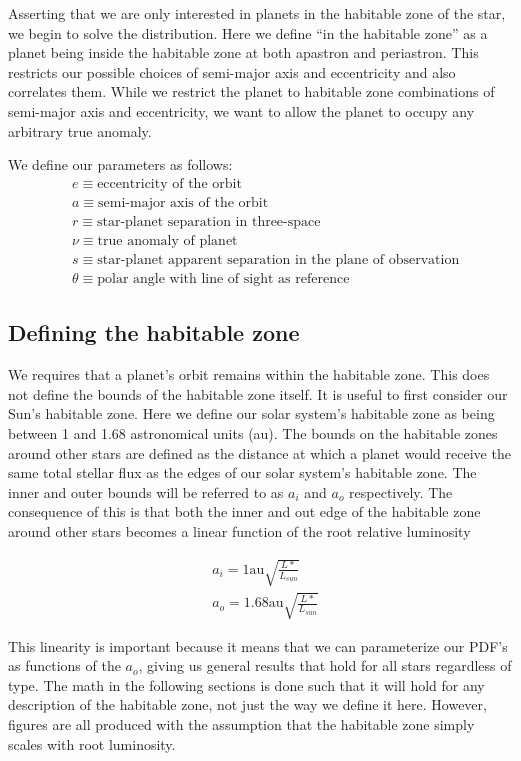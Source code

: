 \documentclass{article}
\begin{document}
	Asserting that we are only interested in planets in the habitable zone of the star, we begin to solve the distribution. Here we define ``in the habitable zone'' as a planet being inside the habitable zone at both apastron and periastron. This restricts our possible choices of semi-major axis and eccentricity and also correlates them. While we restrict the planet to habitable zone combinations of semi-major axis and eccentricity, we want to allow the planet to occupy any arbitrary true anomaly.
	
	We define our parameters as follows:
	\begin{align*}
	&e \equiv \mbox{eccentricity of the orbit}\\
	&a \equiv \mbox{semi-major axis of the orbit}\\
	&r \equiv \mbox{star-planet separation in three-space}\\
	&\nu \equiv \mbox{true anomaly of planet}\\
	&s \equiv \mbox{star-planet apparent separation in the plane of observation}\\
	&\theta \equiv \mbox{polar angle with line of sight as reference}
	\end{align*}
	
	\subsection{Defining the habitable zone}
	
	We requires that a planet's orbit remains within the habitable zone. This does not define the bounds of the habitable zone itself. It is useful to first consider our Sun's habitable zone. Here we define our solar system's habitable zone as being between 1 and 1.68 astronomical units (au). The bounds on the habitable zones around other stars are defined as the distance at which a planet would receive the same total stellar flux as the edges of our solar system's habitable zone. The inner and outer bounds will be referred to as $a_{i}$ and $a_{o}$ respectively. The consequence of this is that both the inner and out edge of the habitable zone around other stars becomes a linear function of the root relative luminosity
	
	\begin{align*}
	&a_i = 1 \mbox{au} \sqrt{\frac{L*}{L_{sun}}} \\
	&a_o = 1.68 \mbox{au} \sqrt{\frac{L*}{L_{sun}}}
	\end{align*}
	
	This linearity is important because it means that we can parameterize our PDF's as functions of the $a_o$, giving us general results that hold for all stars regardless of type. The math in the following sections is done such that it will hold for any description of the habitable zone, not just the way we define it here. However, figures are all produced with the assumption that the habitable zone simply scales with root luminosity. 
	
\end{document}
